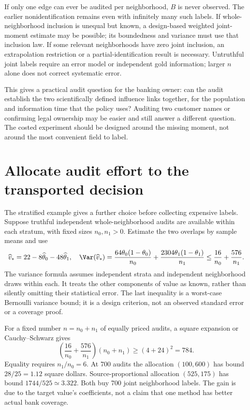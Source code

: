 If only one edge can ever be audited per neighborhood, $B$ is never observed.
The earlier nonidentification remains even with infinitely many such labels.
If whole-neighborhood inclusion is unequal but known, a design-based weighted
joint-moment estimate may be possible; its boundedness and variance must use
that inclusion law. If some relevant neighborhoods have zero joint inclusion,
an extrapolation restriction or a partial-identification result is necessary.
Untruthful joint labels require an error model or independent gold information;
larger $n$ alone does not correct systematic error.

This gives a practical audit question for the banking owner: can the audit
establish the two scientifically defined influence links together, for the
population and information time that the policy uses? Auditing two customer
names or confirming legal ownership may be easier and still answer a different
question. The costed experiment should be designed around the missing moment,
not around the most convenient field to label.

\section{Allocate audit effort to the transported decision}
\label{exec17:s7-allocation}

The stratified example gives a further choice before collecting expensive
labels. Suppose truthful independent whole-neighborhood audits are available
within each stratum, with fixed sizes $n_0,n_1>0$. Estimate the two overlaps
by sample means and use
\begin{equation}
 \widehat v_*=22-8\widehat\theta_0-48\widehat\theta_1,
 \quad
 \Var(\widehat v_*)=
 \frac{64\theta_0(1-\theta_0)}{n_0}
 +\frac{2304\theta_1(1-\theta_1)}{n_1}
 \leq\frac{16}{n_0}+\frac{576}{n_1}.
 \label{exec17:s7-audit-variance}
\end{equation}
The variance formula assumes independent strata and independent neighborhood
draws within each. It treats the other components of value as known, rather
than silently omitting their statistical error. The last inequality is a
worst-case Bernoulli variance bound; it is a design criterion, not an observed
standard error or a coverage proof.

For a fixed number $n=n_0+n_1$ of equally priced audits, a square expansion or
Cauchy--Schwarz gives
\begin{equation}
 \left(\frac{16}{n_0}+\frac{576}{n_1}\right)(n_0+n_1)
 \geq(4+24)^2=784.
 \label{exec17:s7-audit-optimum}
\end{equation}
Equality requires $n_1/n_0=6$. At 700 audits the allocation $(100,600)$ has
bound $28/25=1.12$ square dollars. Source-proportional allocation $(525,175)$
has bound $1744/525\simeq3.322$. Both buy 700 joint neighborhood labels. The
gain is due to the target value's coefficients, not a claim that one method
has better actual bank coverage.\citep{exec17_s7_math}

